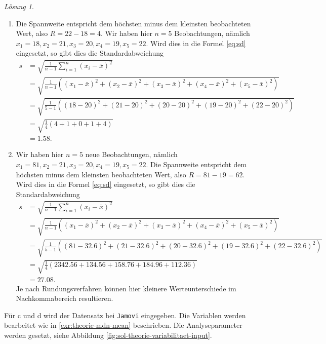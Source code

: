 \documentclass[
]{book}
\providecommand{\tightlist}{%
  \setlength{\itemsep}{0pt}\setlength{\parskip}{0pt}}
\theoremstyle{definition}
\theoremstyle{definition}
\theoremstyle{definition}
\theoremstyle{definition}
\theoremstyle{remark}
\newtheorem*{solution}{Lösung}
\begin{document}
\begin{solution}
\leavevmode

\begin{enumerate}
\def\labelenumi{(\alph{enumi})}
\tightlist
\item
  Die Spannweite entspricht dem höchsten minus dem kleinsten beobachteten Wert, also \(R = 22- 18 = 4\). Wir haben hier \(n=5\) Beobachtungen, nämlich \(x_1 = 18, x_2 = 21, x_3 = 20, x_4 = 19, x_5=22\). Wird dies in die Formel \eqref{eq:sd} eingesetzt, so gibt dies die Standardabweichung
  \begin{align}
      s &= \sqrt{\frac{1}{n-1}\sum^n_{i=1} (x_i-\bar{x})^2} \\
      &= \sqrt{\frac{1}{n-1} \left( (x_1-\bar{x})^2+(x_2-\bar{x})^2+(x_3-\bar{x})^2+(x_4-\bar{x})^2+(x_5-\bar{x})^2\right)} \\
      &=  \sqrt{\frac{1}{5-1} \left( (18-20)^2+(21-20)^2+(20-20)^2+(19-20)^2+(22-20)^2\right)} \\
      &=     \sqrt{\frac{1}{4} \left( 4+1+0+1+4\right)}\\
      &=1.58.
    \end{align}
\item
  Wir haben hier \(n=5\) neue Beobachtungen, nämlich \(x_1 = 81, x_2 = 21, x_3 = 20, x_4 = 19, x_5=22\). Die Spannweite entspricht dem höchsten minus dem kleinsten beobachteten Wert, also \(R = 81 - 19 = 62\). Wird dies in die Formel \eqref{eq:sd} eingesetzt, so gibt dies die Standardabweichung
  \begin{align}
      s &= \sqrt{\frac{1}{n-1}\sum^n_{i=1} (x_i-\bar{x})^2} \\
      &= \sqrt{\frac{1}{n-1} \left( (x_1-\bar{x})^2+(x_2-\bar{x})^2+(x_3-\bar{x})^2+(x_4-\bar{x})^2+(x_5-\bar{x})^2\right)} \\
      &=  \sqrt{\frac{1}{5-1} \left( (81-32.6)^2+(21-32.6)^2+(20-32.6)^2+(19-32.6)^2+(22-32.6)^2\right)} \\
      &=     \sqrt{\frac{1}{4} \left( 2342.56+134.56+158.76+184.96+112.36\right)}\\
      &=27.08.
    \end{align}
  Je nach Rundungsverfahren können hier kleinere Werteunterschiede im Nachkommabereich resultieren.
\end{enumerate}

Für c und d wird der Datensatz bei \texttt{Jamovi} eingegeben. Die Variablen werden bearbeitet wie in \ref{exr:theorie-mdn-mean} beschrieben. Die Analyseparameter werden gesetzt, siehe Abbildung \ref{fig:sol-theorie-variabilitaet-input}.


\end{solution}
\end{document}
